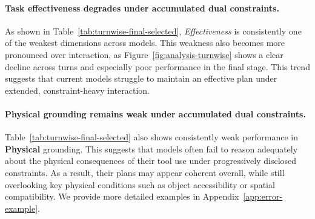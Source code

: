 \paragraph{Task effectiveness degrades under accumulated dual constraints.}
As shown in Table~\ref{tab:turnwise-final-selected}, \textit{Effectiveness} is consistently one of the weakest dimensions across models. 
This weakness also becomes more pronounced over interaction, as Figure~\ref{fig:analysis-turnwise} shows a clear decline across turns and especially poor performance in the final stage. 
This trend suggests that current models struggle to maintain an effective plan under extended, constraint-heavy interaction.


\paragraph{Physical grounding remains weak under accumulated dual constraints.}
Table~\ref{tab:turnwise-final-selected} also shows consistently weak performance in \textbf{Physical} grounding. 
This suggests that models often fail to reason adequately about the physical consequences of their tool use under progressively disclosed constraints. 
As a result, their plans may appear coherent overall, while still overlooking key physical conditions such as object accessibility or spatial compatibility.
We provide more detailed examples in Appendix~\ref{app:error-example}.

